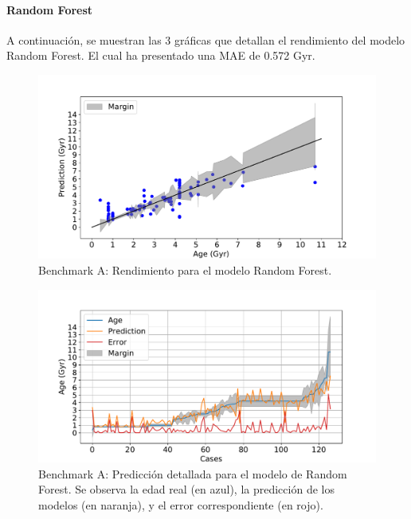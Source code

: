 \paragraph{Random Forest} 
A continuación, se muestran las 3 gráficas que detallan el rendimiento del modelo Random Forest. El cual ha presentado una MAE de 0.572 Gyr.

\begin{figure}[H]
\begin{center}
 \includegraphics[width=0.8\linewidth]{Figuras/Experimentos/B_A_rf_1.pdf}
\end{center}
\caption{Benchmark A: Rendimiento para el modelo Random Forest.}
 \label{fig:benchA_details_rf_1}
\end{figure}

\begin{figure}[H]
\begin{center}
 \includegraphics[width=0.8\linewidth]{Figuras/Experimentos/B_A_rf_2.pdf}
\end{center}
\caption{Benchmark A: Predicción detallada para el modelo de Random Forest. Se observa la edad real (en azul), la predicción de los modelos (en naranja), y el error correspondiente (en rojo).}
 \label{fig:benchA_details_rf_2}
\end{figure}

